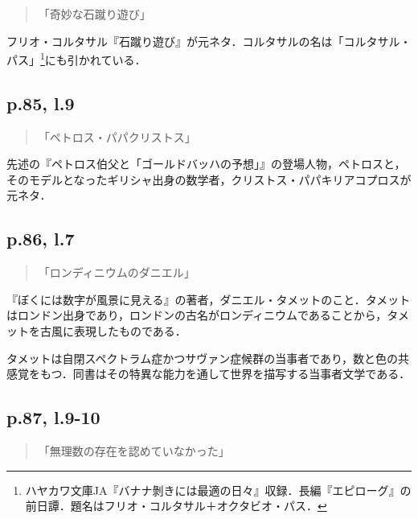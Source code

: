\documentclass[10pt, a5paper, twoside]{jsarticle}
\theoremstyle{definition}
\begin{document}
			\begin{quote}

				「奇妙な石蹴り遊び」
				
			\end{quote}

			フリオ・コルタサル『石蹴り遊び』が元ネタ．コルタサルの名は「コルタサル・パス」\footnote{ハヤカワ文庫JA『バナナ剝きには最適の日々』収録．長編『エピローグ』の前日譚．題名はフリオ・コルタサル＋オクタビオ・パス．}にも引かれている．

		\subsection{p.85, l.9}

			\begin{quote}

				「ペトロス・パパクリストス」
				
			\end{quote}

			先述の『ペトロス伯父と「ゴールドバッハの予想」』の登場人物，ペトロスと，そのモデルとなったギリシャ出身の数学者，クリストス・パパキリアコプロスが元ネタ．

		\subsection{p.86, l.7}

			\begin{quote}

				「ロンディニウムのダニエル」
				
			\end{quote}

			『ぼくには数字が風景に見える』の著者，ダニエル・タメットのこと．タメットはロンドン出身であり，ロンドンの古名がロンディニウムであることから，タメットを古風に表現したものである．

			タメットは自閉スペクトラム症かつサヴァン症候群の当事者であり，数と色の共感覚をもつ．同書はその特異な能力を通して世界を描写する当事者文学である．

		\subsection{p.87, l.9-10}

			\begin{quote}

				「無理数の存在を認めていなかった」
				
			\end{quote}
\end{document}
